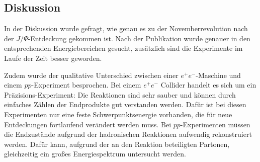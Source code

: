 \subsection{Diskussion}
In der Diskussion wurde gefragt, wie genau es zu der Novemberrevolution nach der $J/\Psi$-Entdeckung gekommen ist.
Nach der Publikation wurde genauer in den entsprechenden Energiebereichen gesucht, zusätzlich sind die Experimente im Laufe der Zeit besser geworden.

Zudem wurde der qualitative Unterschied zwischen einer $e^+ e^-$-Maschine und einem $pp$-Experiment besprochen.
Bei einem $e^+ e^-$ Collider handelt es sich um ein Präzisions-Experiment: Die Reaktionen sind sehr sauber und können durch einfaches Zählen der Endprodukte gut verstanden werden.
Dafür ist bei diesen Experimenten nur eine feste Schwerpunktsenergie vorhanden, die für neue Entdeckungen fortlaufend verändert werden muss.
Bei $pp$-Experimenten müssen die Endzustände aufgrund der hadronischen Reaktionen aufwendig rekonstruiert werden.
Dafür kann, aufgrund der an den Reaktion beteiligten Partonen, gleichzeitig ein großes Energiespektrum untersucht werden.